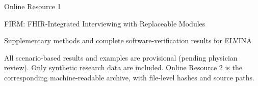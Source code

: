 \documentclass[10pt,a4paper]{article}
\begin{document}
\begin{center}
{\LARGE Online Resource 1}\par
{\large FIRM: FHIR-Integrated Interviewing with Replaceable Modules}\par
{\large Supplementary methods and complete software-verification results for ELVINA}\par
\end{center}
All scenario-based results and examples are provisional (pending physician review).
Only synthetic research data are included. Online Resource 2 is the corresponding
machine-readable archive, with file-level hashes and source paths.
\tableofcontents
\clearpage



\end{document}
